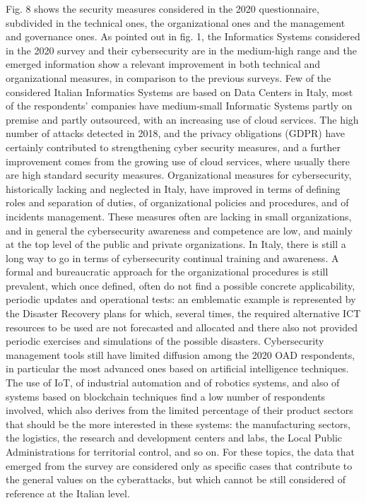 \documentclass{easychair}
\begin{document}
Fig. 8 shows the security measures considered in the 2020 questionnaire, subdivided in the technical ones, the organizational ones and  the management and governance ones. 
As pointed out in fig. 1, the Informatics Systems considered in the 2020 survey and their cybersecurity  are in the medium-high range and the emerged information  show a relevant 
improvement in both technical and organizational measures, in comparison to the previous surveys. Few of the considered Italian Informatics Systems are based on Data Centers in 
Italy, most of the respondents’ companies have medium-small Informatic Systems partly on premise and partly outsourced, with an increasing use of cloud services.
The high number of attacks detected in 2018, and the privacy obligations (GDPR) have certainly contributed to strengthening cyber security measures, and a further improvement 
comes from the growing use of cloud services, where usually there are high standard security measures. Organizational measures for cybersecurity, historically lacking and neglected
in Italy, have improved in terms of defining roles and separation of duties, of organizational policies and procedures, and of incidents management. These measures often are lacking
in small organizations, and in general the cybersecurity awareness and competence are low, and mainly at the top level of the public and private organizations. In Italy, there is 
still a long way to go in terms of cybersecurity continual training and awareness. A formal and bureaucratic approach for the organizational procedures is still prevalent, which 
once defined, often do not find a possible concrete applicability, periodic updates and operational tests: an emblematic example is represented by the Disaster Recovery plans for 
which, several times, the required alternative ICT resources to be used are not forecasted and allocated and there also not provided periodic exercises and simulations of the 
possible disasters. Cybersecurity management tools still have limited diffusion among the 2020 OAD respondents, in particular the most advanced ones based on artificial intelligence
techniques. The use of IoT, of industrial automation and of robotics systems, and also of systems based on blockchain techniques find a low number of respondents involved, which 
also derives from the limited percentage of their product sectors that should be the more interested in these systems: the manufacturing sectors, the logistics, the research and 
development centers and labs, the Local Public Administrations for territorial control, and so on. For these topics, the data that emerged from the survey are considered only as 
specific cases that contribute to the general values on the cyberattacks, but which cannot be still considered of reference at the Italian level.
\end{document}
